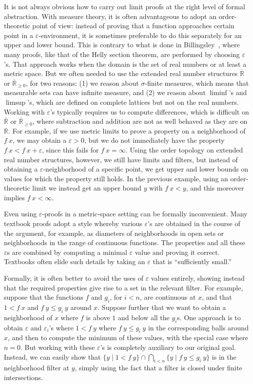 \documentclass{svjour3}
\newcommand{\RR}{\mathbb{R}}
\newcommand{\ennRR}{\overline{\mathbb{R}}_{\ge 0}}
\newcommand{\eRR}{\overline{\mathbb{R}}}
\begin{document}
It is not always obvious how to carry out limit proofs at the right level of formal abstraction. With measure theory, it is often advantageous to adopt an order-theoretic point of view: instead of proving that a function approaches certain point in a $\varepsilon$-environment, it is sometimes preferable to do this separately for an upper and lower bound. This is contrary to what is done in Billingsley~\cite{billingsley:95}, where many proofs, like that of the Helly section theorem, are performed by choosing $\varepsilon$'s. That approach works when the domain is the set of real numbers or at least a metric space. But we often needed to use the extended real number structures $\eRR$ or $\ennRR$, for two reasons: (1) we reason about $\sigma$-finite measures, which means that measurable sets can have infinite measure, and (2) we reason about $\liminf$'s and $\limsup$'s, which are defined on complete lattices but not on the real numbers. Working with $\varepsilon$'s typically requires us to compute differences, which is difficult on $\eRR$ or $\ennRR$, where subtraction and addition are not as well behaved as they are on $\RR$. For example, if we use metric limits to prove a property on a neighborhood of $f~x$, we may obtain a $\varepsilon > 0$, but we do not immediately have the property $f~x < f~x + \varepsilon$, since this fails for $f~x = \infty$. Using the order topology on extended real number structures, however, we still have limits and filters, but instead of obtaining a $\varepsilon$-neighborhood of a specific point, we get upper and lower bounds on values for which the property still holds. In the previous example, using an order-theoretic limit we instead get an upper bound $y$ with $f~x < y$, and this moreover implies $f~x < \infty$.

Even using $\varepsilon$-proofs in a metric-space setting can be formally inconvenient. Many textbook proofs adopt a style whereby various $\varepsilon$'s are obtained in the course of the argument, for example, as diameters of neighborhoods in open sets or neighborhoods in the range of continuous functions. The properties and all these $\varepsilon$s are combined by computing a minimal $\varepsilon$ value and proving it correct. Textbooks often elide such details by taking an $\varepsilon$ that is ``sufficiently small.'' 

Formally, it is often better to avoid the uses of $\varepsilon$ values entirely, showing instead that the required properties give rise to a set in the relevant filter. For example, suppose that the functions $f$ and $g_i$, for $i < n$, are continuous at $x$, and that $1 < f~x$ and $f~y \le g_i~y$ around $x$. Suppose further that we want to obtain a neighborhood of $x$ where $f$ is above $1$ and below all the $g_i$s. One approach is to obtain $\varepsilon$ and $\varepsilon_i$'s where $1 < f~y$ where $f~y \le g_i~y$ in the corresponding balls around $x$, and then to compute the minimum of these values, with the special case where $n = 0$. But working with these $\varepsilon$'s is completely auxiliary to our original goal. Instead, we can easily show that $\{ y \mid 1 < f~y \} \cap \bigcap_{i < n} \{ y \mid f~y \le g_i~y \}$ is in the neighborhood filter at $y$, simply using the fact that a filter is closed under finite intersections.
\end{document}
